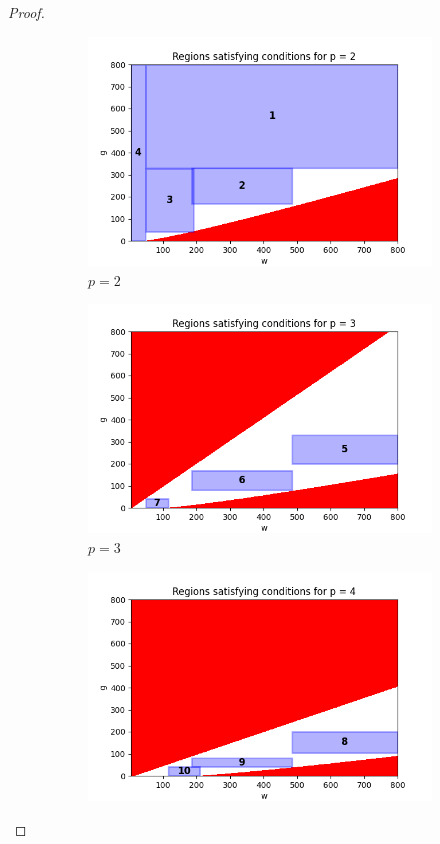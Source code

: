 \documentclass{article}
\begin{document}
\begin{proof}
\begin{figure}[ht]
    \centering
    \begin{subfigure}{0.32\textwidth}
        \includegraphics[width=\linewidth]{plotsgen/plot_p_2.png}
        \caption{$p = 2$}
    \end{subfigure}
    \hfill
    \begin{subfigure}{0.32\textwidth}
        \includegraphics[width=\linewidth]{plotsgen/plot_p_3.png}
        \caption{$p = 3$}
    \end{subfigure}
    \hfill
    \begin{subfigure}{0.32\textwidth}
        \includegraphics[width=\linewidth]{plotsgen/plot_p_4.png}

\end{subfigure}
\end{figure}
\end{proof}
\end{document}
